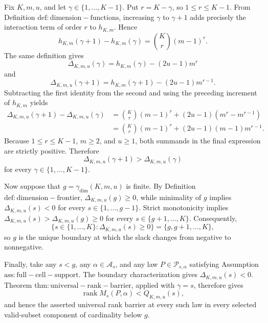 Fix \(K,m,u\), and let \(\gamma\in\{1,\ldots,K-1\}\). Put \(r=K-\gamma\), so \(1\le r\le K-1\). From Definition \(\mathrm{def:dimension-functions}\), increasing \(\gamma\) to \(\gamma+1\) adds precisely the interaction term of order \(r\) to \(h_{K,m}\). Hence
\[h_{K,m}(\gamma+1)-h_{K,m}(\gamma)=\binom Kr(m-1)^r.\]
The same definition gives
\[\Delta_{K,m,u}(\gamma)=h_{K,m}(\gamma)-(2u-1)m^r\]
and
\[\Delta_{K,m,u}(\gamma+1)=h_{K,m}(\gamma+1)-(2u-1)m^{r-1}.\]
Subtracting the first identity from the second and using the preceding increment of \(h_{K,m}\) yields
\[\begin{aligned}
\Delta_{K,m,u}(\gamma+1)-\Delta_{K,m,u}(\gamma)
&=\binom Kr(m-1)^r+(2u-1)(m^r-m^{r-1})\\
&=\binom Kr(m-1)^r+(2u-1)(m-1)m^{r-1}.
\end{aligned}\]
Because \(1\le r\le K-1\), \(m\ge2\), and \(u\ge1\), both summands in the final expression are strictly positive. Therefore
\[\Delta_{K,m,u}(\gamma+1)>\Delta_{K,m,u}(\gamma)\]
for every \(\gamma\in\{1,\ldots,K-1\}\).

Now suppose that \(g=\gamma_{\mathrm{dim}}(K,m,u)\) is finite. By Definition \(\mathrm{def:dimension-frontier}\), \(\Delta_{K,m,u}(g)\ge0\), while minimality of \(g\) implies \(\Delta_{K,m,u}(s)<0\) for every \(s\in\{1,\ldots,g-1\}\). Strict monotonicity implies \(\Delta_{K,m,u}(s)>\Delta_{K,m,u}(g)\ge0\) for every \(s\in\{g+1,\ldots,K\}\). Consequently,
\[\{s\in\{1,\ldots,K\}:\Delta_{K,m,u}(s)\ge0\}=\{g,g+1,\ldots,K\},\]
so \(g\) is the unique boundary at which the slack changes from negative to nonnegative.

Finally, take any \(s<g\), any \(\alpha\in\mathcal A_s\), and any law \(P\in\mathcal P_{s,\alpha}\) satisfying Assumption \(\mathrm{ass:full-cell-support}\). The boundary characterization gives \(\Delta_{K,m,u}(s)<0\). Theorem \(\mathrm{thm:universal-rank-barrier}\), applied with \(\gamma=s\), therefore gives
\[\operatorname{rank}M_s(P,\alpha)<Q_{K,m,u}(s),\]
and hence the asserted universal rank barrier at every such law in every selected valid-subset component of cardinality below \(g\).